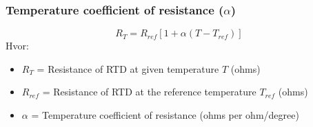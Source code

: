 \documentclass[aspectratio=169,xcolor=dvipsnames]{beamer}
\begin{document}
%
%
%
%
%
%
\begin{frame}
	\frametitle{Temperature coefficient of resistance ($\alpha$)}

$$R_T = R_{ref}[1 + \alpha(T - T_{ref})]$$
	Hvor:
\begin{itemize}
	\item $R_T$ = Resistance of RTD at given temperature $T$ (ohms)
	\item $R_{ref}$ = Resistance of RTD at the reference temperature $T_{ref}$ (ohms)
	\item $\alpha$ = Temperature coefficient of resistance (ohms per ohm/degree)
\end{itemize}

	

\end{frame}
\end{document}
